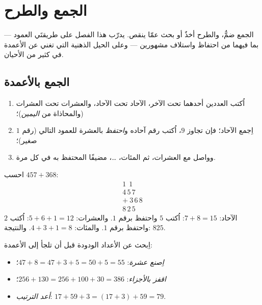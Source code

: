 \chapter{الجمع والطرح}\label{ch:g3:addsub}

الجمع ضمٌّ، والطرح أخذٌ أو بحث عمّا ينقص. يدرّب هذا الفصل على
طريقتَي العمود --- بما فيهما من احتفاظ واستلاف مشهورين --- وعلى
الحيل الذهنية التي تغني عن الأعمدة في كثير من
الأحيان.

\section{الجمع بالأعمدة}

\begin{method}\label{met:g3:addsub:add}
\begin{enumerate}
  \item اُكتب العددين أحدهما تحت الآخر، الآحاد تحت الآحاد،
        والعشرات تحت العشرات (والمحاذاة من \emph{اليمين})؛
  \item اِجمع الآحاد؛ فإن تجاوز  $9$، اُكتب رقم آحاده
        و\emph{احتفظ} بالعشرة للعمود التالي (رقم $1$ صغير)؛
  \item وواصل مع العشرات، ثم المئات، \dots، مضيفًا المحتفظ به
        في كل مرة.
\end{enumerate}
\end{method}

\begin{example}\label{ex:g3:addsub:add}
احسب $457 + 368$:
\[
\begin{array}{r}
{\scriptstyle 1}\ \ {\scriptstyle 1}\ \ \phantom{0} \\[-3pt]
4\,5\,7 \\
+\ 3\,6\,8 \\
\hline
8\,2\,5
\end{array}
\]
الآحاد: $7 + 8 = 15$: اُكتب $5$ واحتفظ برقم $1$. والعشرات:
$5 + 6 + 1 = 12$: اُكتب $2$ واحتفظ برقم $1$. والمئات: $4 + 3 + 1 = 8$.
والنتيجة: $825$.
\end{example}

\begin{example}\label{ex:g3:addsub:mental}
اِبحث عن الأعداد الودودة قبل أن تلجأ إلى الأعمدة:
\begin{itemize}
  \item \emph{اِصنع عشرة}: $47 + 8 = 47 + 3 + 5 = 50 + 5 = 55$؛
  \item \emph{اقفز بالأجزاء}: $256 + 130 = 256 + 100 + 30 = 386$؛
  \item \emph{أعد الترتيب}: $17 + 59 + 3 = (17 + 3) + 59 = 79$.
\end{itemize}
\end{example}

